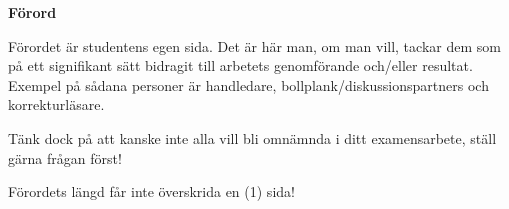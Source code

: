 \begin{mdframed}[innertopmargin=10pt, innerbottommargin=10pt, innerleftmargin=10pt, innerrightmargin=10pt, skipabove=10pt, skipbelow=10pt, roundcorner=10pt]
    \textbf{Förord}
    
    Förordet är studentens egen sida. Det är här man, om man vill, tackar dem som på ett signifikant sätt bidragit till arbetets genomförande och/eller resultat. Exempel på sådana personer är handledare, bollplank/diskussionspartners och korrekturläsare.
    
    Tänk dock på att kanske inte alla vill bli omnämnda i ditt examensarbete, ställ gärna frågan först!
    
    Förordets längd får inte överskrida en (1) sida!
    \end{mdframed}
